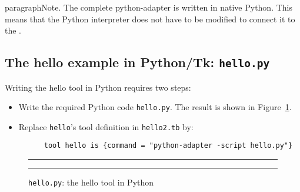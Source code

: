 paragraph{Note.} The complete python-adapter is written in native Python.
This means that the Python interpreter does not have to be modified
to connect it to the \TB.


\subsection{\label{Ex-hello.py}The hello example in Python/Tk: {\tt hello.py}}

Writing the hello tool in Python requires two steps:
\begin{itemize}
\item Write the required Python code {\tt hello.py}. 
The result is shown in Figure~\ref{fig:hello.py}.
\item Replace {\tt hello}'s tool definition in {\tt hello2.tb} by:
\begin{verbatim}
      tool hello is {command = "python-adapter -script hello.py"}
\end{verbatim}
\end{itemize}


\begin{figure}
\rule{\textwidth}{0.5mm}

  \caption{{\tt hello.py}: the hello tool in Python}
  \label{fig:hello.py}
\rule{\textwidth}{0.5mm}
\end{figure}
